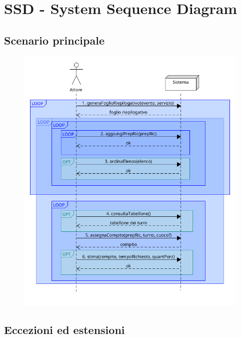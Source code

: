 \chapter{SSD - System Sequence Diagram}

\section{Scenario principale}

\begin{figure}[h]
  \begin{center}
    \includegraphics[scale = 0.47]{images/SSD/SSD - Scenario principale.png}
  \end{center}
\end{figure}

\section{Eccezioni ed estensioni}
